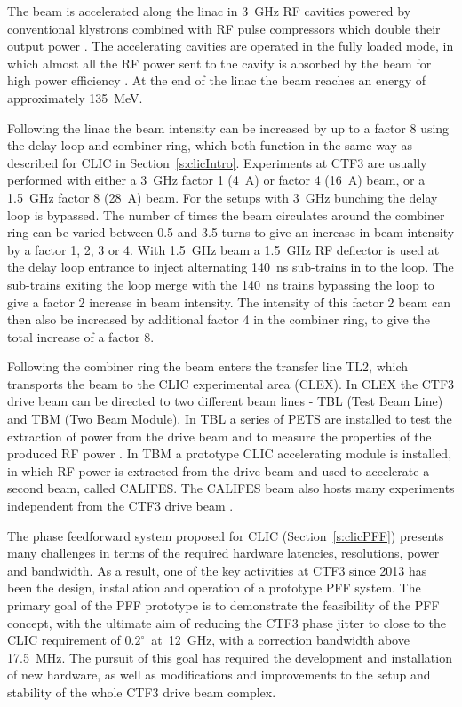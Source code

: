 The beam is accelerated along the linac in 3~GHz RF cavities powered by conventional klystrons combined with RF pulse compressors which double their output power \cite{rfCompress}. The accelerating cavities are operated in the fully loaded mode, in which almost all the RF power sent to the cavity is absorbed by the beam for high power efficiency \cite{fullyLoaded}. At the end of the linac the beam reaches an energy of approximately 135~MeV.

Following the linac the beam intensity can be increased by up to a factor 8 using the delay loop and combiner ring, which both function in the same way as described for CLIC in Section~\ref{s:clicIntro}. Experiments at CTF3 are usually performed with either a 3~GHz factor 1 (4~A) or factor 4 (16~A) beam, or a 1.5~GHz factor 8 (28~A) beam. For the setups with 3~GHz bunching the delay loop is bypassed. The number of times the beam circulates around the combiner ring can be varied between 0.5 and 3.5 turns to give an increase in beam intensity by a factor 1, 2, 3 or 4. With 1.5~GHz beam a 1.5~GHz RF deflector \cite{rfDeflect} is used at the delay loop entrance to inject alternating 140~ns sub-trains in to the loop. The sub-trains exiting the loop merge with the 140~ns trains bypassing the loop to give a factor 2 increase in beam intensity. The intensity of this factor 2 beam can then also be increased by additional factor 4 in the combiner ring, to give the total increase of a factor 8.

Following the combiner ring the beam enters the transfer line TL2, which transports the beam to the CLIC experimental area (CLEX). In CLEX the CTF3 drive beam can be directed to two different beam lines - TBL (Test Beam Line) and TBM (Two Beam Module). In TBL a series of PETS are installed to test the extraction of power from the drive beam and to measure the properties of the produced RF power \cite{tbl}. In TBM a prototype CLIC accelerating module is installed, in which RF power is extracted from the drive beam and used to accelerate a second beam, called CALIFES. The CALIFES beam also hosts many experiments independent from the CTF3 drive beam \cite{califes}.


The phase feedforward system proposed for CLIC (Section~\ref{s:clicPFF}) presents many challenges in terms of the required hardware latencies, resolutions, power and bandwidth. As a result, one of the key activities at CTF3 since 2013 has been the design, installation and operation of a prototype PFF system. The primary goal of the PFF prototype is to demonstrate the feasibility of the PFF concept, with the ultimate aim of reducing the CTF3 phase jitter to close to the CLIC requirement of \(0.2^\circ\)~at~12~GHz, with a correction bandwidth above 17.5~MHz. The pursuit of this goal has required the development and installation of new hardware, as well as modifications and improvements to the setup and stability of the whole CTF3 drive beam complex.

